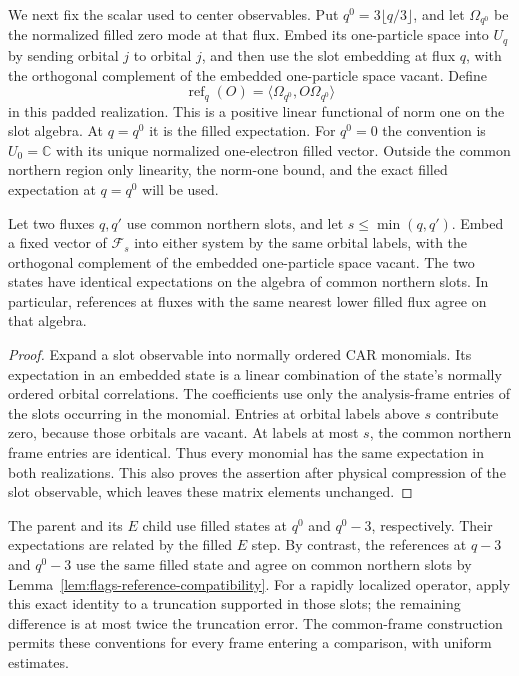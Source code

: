 We next fix the scalar used to center observables.  Put
$q^0=3\lfloor q/3\rfloor$, and let $\Omega_{q^0}$ be the normalized
filled zero mode at that flux.  Embed its one-particle space into $U_q$
by sending orbital $j$ to orbital $j$, and then use the slot embedding
at flux $q$, with the orthogonal complement of the embedded one-particle
space vacant.  Define
\begin{equation}
 \operatorname{ref}_q(O)=
 \langle\Omega_{q^0},O\Omega_{q^0}\rangle
 \label{eq:flags-reference}
\end{equation}
in this padded realization.  This is a positive linear functional of
norm one on the slot algebra.  At $q=q^0$ it is the filled expectation.
For $q^0=0$ the convention is $U_0=\mathbb C$ with its unique normalized
one-electron filled vector.  Outside the common northern region only
linearity, the norm-one bound, and the exact filled expectation at
$q=q^0$ will be used.

\begin{lemma}
\label{lem:flags-reference-compatibility}
Let two fluxes $q,q'$ use common northern slots, and let
$s\leq\min(q,q')$.  Embed a fixed vector of $\mathcal F_s$ into either
system by the same orbital labels, with the orthogonal complement of
the embedded one-particle space vacant.  The two states have identical
expectations on the algebra of common northern slots.  In particular,
references at fluxes with the same nearest lower filled flux agree on
that algebra.
\end{lemma}

\begin{proof}
Expand a slot observable into normally ordered CAR monomials.  Its
expectation in an embedded state is a linear combination of the state's
normally ordered orbital correlations.  The coefficients use only the
analysis-frame entries of the slots occurring in the monomial.  Entries
at orbital labels above $s$ contribute zero, because those orbitals are
vacant.  At labels at most $s$, the common northern frame entries are
identical.  Thus every monomial has the same expectation in both
realizations.  This also proves the assertion after physical compression
of the slot observable, which leaves these matrix elements unchanged.
\end{proof}

The parent and its $E$ child use filled states at $q^0$ and $q^0-3$,
respectively.  Their expectations are related by the filled $E$ step.
By contrast, the references at $q-3$ and $q^0-3$ use the same filled
state and agree on common northern slots by
Lemma~\ref{lem:flags-reference-compatibility}.  For a rapidly localized
operator, apply this exact identity to a truncation supported in those
slots; the remaining difference is at most twice the truncation error.
The common-frame construction permits these conventions for every
frame entering a comparison, with uniform estimates.

